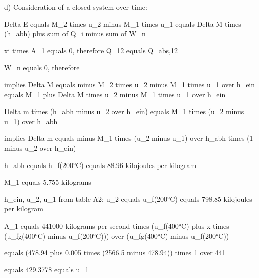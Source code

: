 d) Consideration of a closed system over time:

Delta E equals M_2 times u_2 minus M_1 times u_1 equals Delta M times (h_abh) plus sum of Q_i minus sum of W_n

xi times A_1 equals 0, therefore Q_12 equals Q_abs,12

W_n equals 0, therefore

implies Delta M equals minus M_2 times u_2 minus M_1 times u_1 over h_ein equals M_1 plus Delta M times u_2 minus M_1 times u_1 over h_ein

Delta m times (h_abh minus u_2 over h_ein) equals M_1 times (u_2 minus u_1) over h_abh

implies Delta m equals minus M_1 times (u_2 minus u_1) over h_abh times (1 minus u_2 over h_ein)

h_abh equals h_f(200°C) equals 88.96 kilojoules per kilogram

M_1 equals 5.755 kilograms

h_ein, u_2, u_1 from table A2: u_2 equals u_f(200°C) equals 798.85 kilojoules per kilogram

A_1 equals 441000 kilograms per second times (u_f(400°C) plus x times (u_fg(400°C) minus u_f(200°C))) over (u_fg(400°C) minus u_f(200°C))

equals (478.94 plus 0.005 times (2566.5 minus 478.94)) times 1 over 441

equals 429.3778 equals u_1